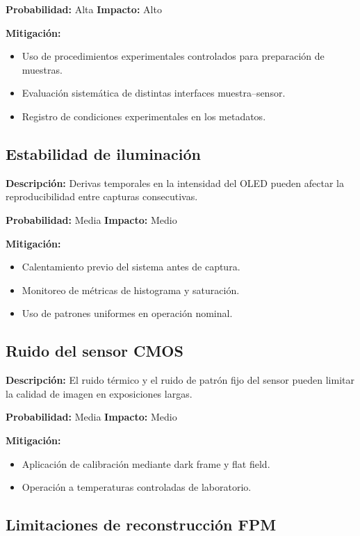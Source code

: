 \textbf{Probabilidad:} Alta  
\textbf{Impacto:} Alto  

\textbf{Mitigación:}
\begin{itemize}
    \item Uso de procedimientos experimentales controlados para preparación de
    muestras.
    \item Evaluación sistemática de distintas interfaces muestra--sensor.
    \item Registro de condiciones experimentales en los metadatos.
\end{itemize}

\subsection{Estabilidad de iluminación}

\textbf{Descripción:}  
Derivas temporales en la intensidad del OLED pueden afectar la reproducibilidad
entre capturas consecutivas.

\textbf{Probabilidad:} Media  
\textbf{Impacto:} Medio  

\textbf{Mitigación:}
\begin{itemize}
    \item Calentamiento previo del sistema antes de captura.
    \item Monitoreo de métricas de histograma y saturación.
    \item Uso de patrones uniformes en operación nominal.
\end{itemize}

\subsection{Ruido del sensor CMOS}

\textbf{Descripción:}  
El ruido térmico y el ruido de patrón fijo del sensor pueden limitar la calidad de
imagen en exposiciones largas.

\textbf{Probabilidad:} Media  
\textbf{Impacto:} Medio  

\textbf{Mitigación:}
\begin{itemize}
    \item Aplicación de calibración mediante dark frame y flat field.
    \item Operación a temperaturas controladas de laboratorio.
\end{itemize}

\subsection{Limitaciones de reconstrucción FPM}

